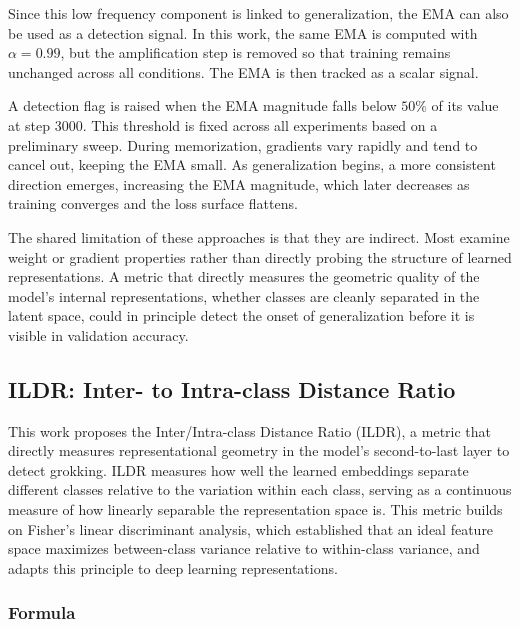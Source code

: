 \documentclass{article}
\begin{document}
\vspace{3pt}
Since this low frequency component is linked to generalization, the EMA can also be used as a detection signal. In this work, the same EMA is computed with $\alpha = 0.99$, but the amplification step is removed so that training remains unchanged across all conditions. The EMA is then tracked as a scalar signal.

\vspace{3pt}
A detection flag is raised when the EMA magnitude falls below $50\%$ of its value at step 3000. This threshold is fixed across all experiments based on a preliminary sweep. During memorization, gradients vary rapidly and tend to cancel out, keeping the EMA small. As generalization begins, a more consistent direction emerges, increasing the EMA magnitude, which later decreases as training converges and the loss surface flattens.


\vspace{3pt}

The shared limitation of these approaches is that they are indirect. Most examine weight or gradient properties rather than directly probing the structure of learned representations. A metric that directly measures the geometric quality of the model's internal representations, whether classes are cleanly separated in the latent space, could in principle detect the onset of generalization before it is visible in validation accuracy. 

\subsection{ILDR: Inter- to Intra-class Distance Ratio}

This work proposes the Inter/Intra-class Distance Ratio (ILDR), a metric that directly measures representational geometry in the model's second-to-last layer to detect grokking. ILDR measures how well the learned embeddings separate different classes relative to the variation within each class, serving as a continuous measure of how linearly separable the representation space is. This metric builds on Fisher's linear discriminant analysis, which established that an ideal feature space maximizes between-class variance relative to within-class variance, and adapts this principle to deep learning representations. 




\subsubsection{Formula}
\end{document}
